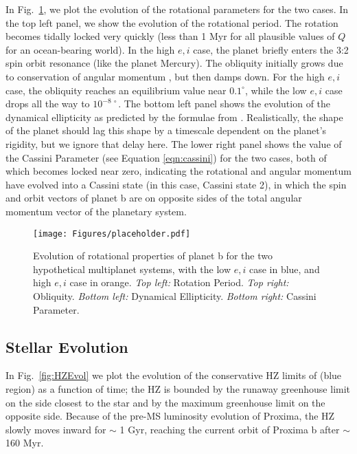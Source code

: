\documentclass[preprint,12pt]{aastex}
\begin{document}
In Fig.~\ref{fig:MultiSpins}, we plot the evolution of the rotational
parameters for the two cases. In the top left panel, we show the
evolution of the rotational period. The rotation becomes tidally
locked very quickly (less than 1 Myr for all plausible values of $Q$
for an ocean-bearing world).  In the high $e,i$ case, the planet
briefly enters the 3:2 spin orbit resonance (like the planet Mercury).
The obliquity initially grows due to conservation of angular momentum
\citep{Correia08}, but then damps down. For the high $e,i$ case, the
obliquity reaches an equilibrium value near $0.1^\circ$, while the low
$e,i$ case drops all the way to $10^{-8~\circ}$. The bottom left panel
shows the evolution of the dynamical ellipticity as predicted by the
formulae from \cite{Atobe2007}.  Realistically, the shape of the
planet should lag this shape by a timescale dependent on the planet's
rigidity, but we ignore that delay here. The lower right panel shows the
value of the Cassini Parameter (see Equation \ref{eqn:cassini}) for
the two cases, both of which becomes locked near zero, indicating the
rotational and angular momentum have evolved into a Cassini state (in
this case, Cassini state 2), in which the spin and orbit vectors
of planet b are on opposite sides of the total angular momentum vector
of the planetary system.

\begin{figure} 
\begin{center}
\texttt{[image: Figures/placeholder.pdf]}
\end{center}
\caption{Evolution of rotational properties of planet b for the
 two hypothetical multiplanet systems, with the low $e,i$ case 
 in blue, and high $e,i$ case in orange. {\it Top left:} Rotation
 Period. {\it Top right:} Obliquity. {\it Bottom left:} Dynamical
 Ellipticity. {\it Bottom right:} Cassini Parameter.}
\label{fig:MultiSpins}
\end{figure}

\subsection{Stellar Evolution}
\label{sec:results:stellar}


In Fig.~\ref{fig:HZEvol} we plot the evolution of the conservative HZ
limits of \cite{Kopparapu13} (blue region) as a function of time; the
HZ is bounded by the runaway greenhouse limit on the side closest to
the star and by the maximum greenhouse limit on the opposite
side. Because of the pre-MS luminosity evolution of
Proxima, the HZ slowly moves inward for $\sim$ 1 Gyr, reaching the
current orbit of Proxima b after $\sim$ 160 Myr.
\end{document}
